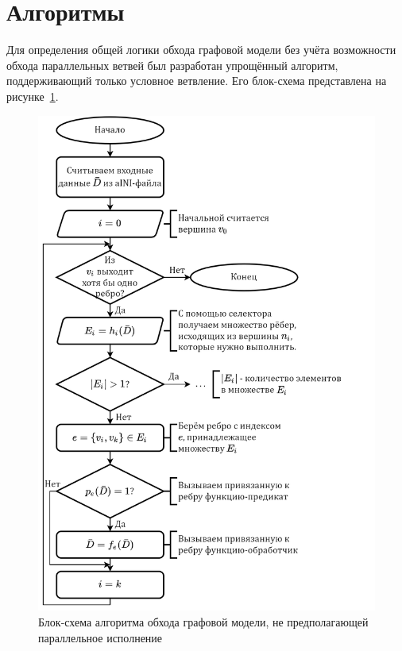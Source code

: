 \section{Алгоритмы}\label{sec:algorithm_desc}
Для определения общей логики обхода графовой модели без учёта возможности обхода параллельных ветвей был разработан упрощённый алгоритм, поддерживающий только условное ветвление. Его блок-схема представлена на рисунке~\ref{fig:flowchartNoBranching}.
\begin{figure}[H]
    \centering
    \includegraphics[height=0.6\textheight]{figures/flowchart.graphRunning1.png}
    \caption{Блок-схема алгоритма обхода графовой модели, не предполагающей параллельное исполнение}
    \label{fig:flowchartNoBranching}
\end{figure}

